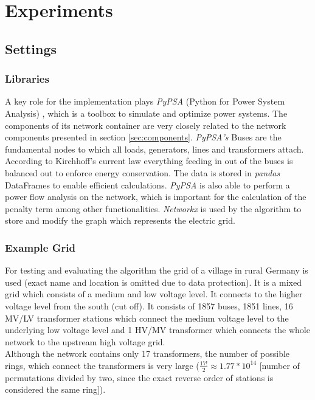 \chapter{Experiments}\label{chap:experiments}

\section{Settings}
\subsection{Libraries}\label{pypsa}
A key role for the implementation plays \textit{PyPSA} (Python for Power System Analysis) \cite{brown2017pypsa}, which is a toolbox to simulate and optimize power systems. The components of its network container are very closely related to the network components presented in section \ref{sec:components}. \textit{PyPSA's} Buses are the fundamental nodes to which all loads, generators, lines and transformers attach. According to Kirchhoff's current law everything feeding in out of the buses is balanced out to enforce energy conservation. The data is stored in \textit{pandas} DataFrames to enable efficient calculations. \textit{PyPSA} is also able to perform a power flow analysis on the network, which is important for the calculation of the penalty term among other functionalities. \textit{Networkx} is used by the algorithm to store and modify the graph which represents the electric grid.

\subsection{Example Grid}
For testing and evaluating the algorithm the grid of a village in rural Germany is used (exact name and location is omitted due to data protection). It is a mixed grid which consists of a medium and low voltage level. It connects to the higher voltage level from the south (cut off). It consists of 1857 buses, 1851 lines, 16 MV/LV transformer stations which connect the medium voltage level to the underlying low voltage level and 1 HV/MV transformer which connects the whole network to the upstream high voltage grid. \\
Although the network contains only 17 transformers, the number of possible rings, which connect the transformers is very large ($\frac{17!}{2} \approx 1.77*10^{14}$ [number of permutations divided by two, since the exact reverse order of stations is considered the same ring]). \\

